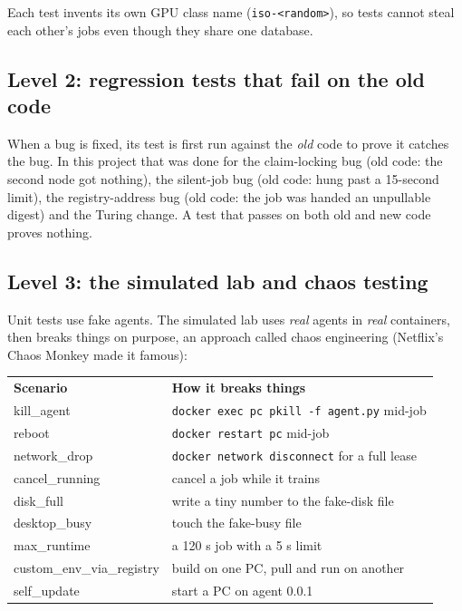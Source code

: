 Each test invents its own GPU class name (\texttt{iso-<random>}), so tests
cannot steal each other's jobs even though they share one database.

\subsection{Level 2: regression tests that fail on the old code}

When a bug is fixed, its test is first run against the \emph{old} code to
prove it catches the bug. In this project that was done for the claim-locking
bug (old code: the second node got nothing), the silent-job bug (old code: hung
past a 15-second limit), the registry-address bug (old code: the job was handed
an unpullable digest) and the Turing change. A test that passes on both old and
new code proves nothing.

\subsection{Level 3: the simulated lab and chaos testing}

Unit tests use fake agents. The simulated lab uses \emph{real} agents in
\emph{real} containers, then breaks things on purpose, an approach called chaos
engineering (Netflix's Chaos Monkey made it famous):

\begin{center}
\begin{tabular}{ll}
\textbf{Scenario} & \textbf{How it breaks things} \\
kill\_agent & \texttt{docker exec pc pkill -f agent.py} mid-job \\
reboot & \texttt{docker restart pc} mid-job \\
network\_drop & \texttt{docker network disconnect} for a full lease \\
cancel\_running & cancel a job while it trains \\
disk\_full & write a tiny number to the fake-disk file \\
desktop\_busy & touch the fake-busy file \\
max\_runtime & a 120 s job with a 5 s limit \\
custom\_env\_via\_registry & build on one PC, pull and run on another \\
self\_update & start a PC on agent 0.0.1 \\
\end{tabular}
\end{center}

